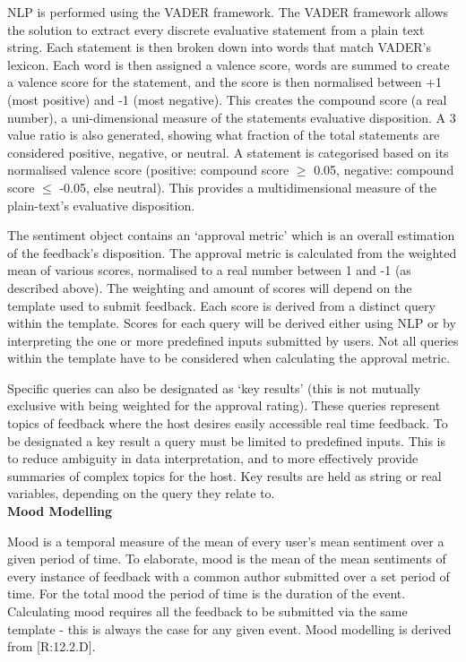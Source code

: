 \documentclass[9pt, titlepage]{extarticle}
\begin{document}
NLP is performed using the VADER framework. The VADER framework allows the solution to extract every discrete evaluative statement from a plain text string. Each statement is then broken down into words that match VADER's lexicon. Each word is then assigned a valence score, words are summed to create a valence score for the statement, and the score is then normalised between +1 (most positive) and -1 (most negative). This creates the compound score (a real number), a uni-dimensional measure of the statements evaluative disposition. A 3 value ratio is also generated, showing what fraction of the total statements are considered positive, negative, or neutral. A statement is categorised based on its normalised valence score (positive: compound score $\geq$ 0.05, negative: compound score $\leq$ -0.05, else neutral). This provides a multidimensional measure of the plain-text's evaluative disposition.\newline

The sentiment object contains an `approval metric' which is an overall estimation of the feedback's disposition. The approval metric is calculated from the weighted mean of various scores, normalised to a real number between 1 and -1 (as described above). The weighting and amount of scores will depend on the template used to submit feedback. Each score is derived from a distinct query within the template. Scores for each query will be derived either using NLP or by interpreting the one or more predefined inputs submitted by users. Not all queries within the template have to be considered when calculating the approval metric.\newline

Specific queries can also be designated as `key results' (this is not mutually exclusive with being weighted for the approval rating). These queries represent topics of feedback where the host desires easily accessible real time feedback. To be designated a key result a query must be limited to predefined inputs. This is to reduce ambiguity in data interpretation, and to more effectively provide summaries of complex topics for the host. Key results are held as string or real variables, depending on the query they relate to.\\

\textbf{Mood Modelling}

Mood is a temporal measure of the mean of every user's mean sentiment over a given period of time. To elaborate, mood is the mean of the mean sentiments of every instance of feedback with a common author submitted over a set period of time. For the total mood the period of time is the duration of the event. Calculating mood requires all the feedback to be submitted via the same template - this is always the case for any given event. Mood modelling is derived from [R:12.2.D]. \\
\end{document}
